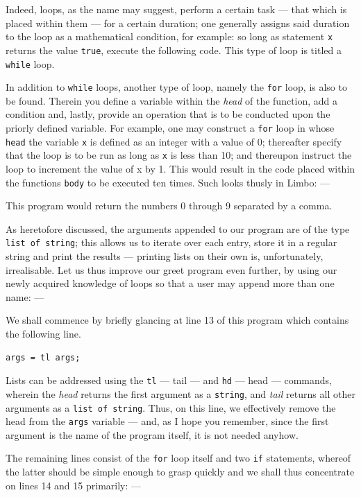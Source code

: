 \documentclass[a5paper,twoside,12pt]{report}
\begin{document}
Indeed, loops, as the name may suggest, perform a certain task — that which is placed within them — for a certain duration; one generally assigns said duration to the loop as a mathematical condition, for example: so long as statement \texttt{x} returns the value \texttt{true}, execute the following code. This type of loop is titled a \texttt{while} loop.

In addition to \texttt{while} loops, another type of loop, namely the \texttt{for} loop, is also to be found. Therein you define a variable within the \textit{head} of the function, add a condition and, lastly, provide an operation that is to be conducted upon the priorly defined variable. For example, one may construct a \texttt{for} loop in whose \texttt{head} the variable \texttt{x} is defined as an integer with a value of 0; thereafter specify that the loop is to be run as long as \texttt{x} is less than 10; and thereupon instruct the loop to increment the value of x by 1. This would result in the code placed within the functions \texttt{body} to be executed ten times. Such looks thusly in Limbo: —



This program would return the numbers 0 through 9 separated by a comma. 

As heretofore discussed, the arguments appended to our program are of the type \texttt{list of string}; this allows us to iterate over each entry, store it in a regular string and print the results — printing lists on their own is, unfortunately, irrealisable. Let us thus improve our greet program even further, by using our newly acquired knowledge of loops so that a user may append more than one name: —


We shall commence by briefly glancing at line 13 of this program which contains the following line.
\begin{lstlisting}
args = tl args;
\end{lstlisting}

Lists can be addressed using the \texttt{tl} — tail — and \texttt{hd} — head — commands, wherein the \textit{head} returns the first argument as a \texttt{string}, and \textit{tail} returns all other arguments as a \texttt{list of string}. Thus, on this line, we effectively remove the head from the \texttt{args} variable — and, as I hope you remember, since the first argument is the name of the program itself, it is not needed anyhow.

The remaining lines consist of the \texttt{for} loop itself and two \texttt{if} statements, whereof the latter should be simple enough to grasp quickly and we shall thus concentrate on lines 14 and 15 primarily: —
\end{document}
